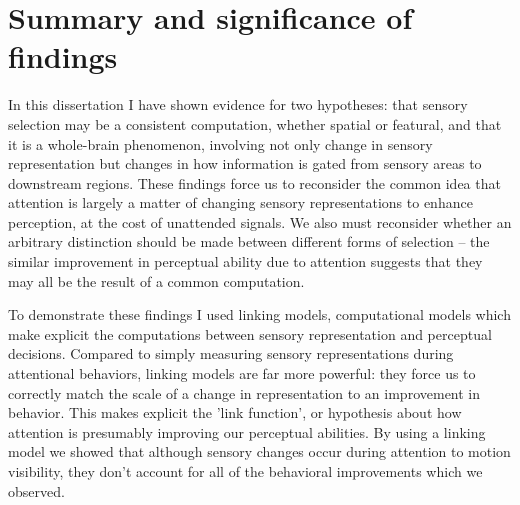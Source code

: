
\section{Summary and significance of findings}

In this dissertation I have shown evidence for two hypotheses: that sensory selection may be a consistent computation, whether spatial or featural, and that it is a whole-brain phenomenon, involving not only change in sensory representation but changes in how information is gated from sensory areas to downstream regions. These findings force us to reconsider the common idea that attention is largely a matter of changing sensory representations to enhance perception, at the cost of unattended signals. We also must reconsider whether an arbitrary distinction should be made between different forms of selection -- the similar improvement in perceptual ability due to attention suggests that they may all be the result of a common computation. 

To demonstrate these findings I used linking models, computational models which make explicit the computations between sensory representation and perceptual decisions. Compared to simply measuring sensory representations during attentional behaviors, linking models are far more powerful: they force us to correctly match the scale of a change in representation to an improvement in behavior. This makes explicit the 'link function', or hypothesis about how attention is presumably improving our perceptual abilities. By using a linking model we showed that although sensory changes occur during attention to motion visibility, they don't account for all of the behavioral improvements which we observed. 
